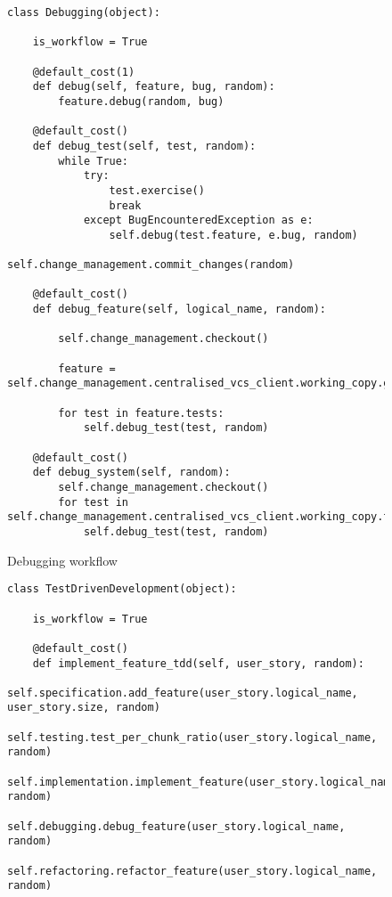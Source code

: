 \documentclass{sig-alternate}
\begin{document}
\begin{figure*}

  \begin{subfigure}{\linewidth}
\begin{lstlisting}
class Debugging(object):

    is_workflow = True

    @default_cost(1)
    def debug(self, feature, bug, random):
        feature.debug(random, bug)

    @default_cost()
    def debug_test(self, test, random):
        while True:
            try:
                test.exercise()
                break
            except BugEncounteredException as e:
                self.debug(test.feature, e.bug, random)
                self.change_management.commit_changes(random)

    @default_cost()
    def debug_feature(self, logical_name, random):

        self.change_management.checkout()

        feature = self.change_management.centralised_vcs_client.working_copy.get_feature(logical_name)

        for test in feature.tests:
            self.debug_test(test, random)

    @default_cost()
    def debug_system(self, random):
        self.change_management.checkout()
        for test in self.change_management.centralised_vcs_client.working_copy.tests:
            self.debug_test(test, random)

\end{lstlisting}

    \caption{Debugging workflow}
    \label{fig:debugging}
  \end{subfigure}


  \vspace{10pt}

  \begin{subfigure}{\linewidth}
\begin{lstlisting}
class TestDrivenDevelopment(object):

    is_workflow = True

    @default_cost()
    def implement_feature_tdd(self, user_story, random):
        self.specification.add_feature(user_story.logical_name, user_story.size, random)
        self.testing.test_per_chunk_ratio(user_story.logical_name, random)
        self.implementation.implement_feature(user_story.logical_name, random)
        self.debugging.debug_feature(user_story.logical_name, random)
        self.refactoring.refactor_feature(user_story.logical_name, random)


\end{lstlisting}
\end{subfigure}
\end{figure*}
\end{document}
